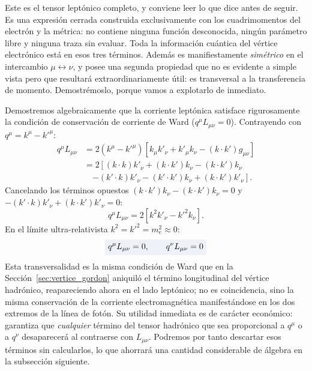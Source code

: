 \documentclass[10pt,a4paper]{article}
\newcommand{\dest}[1]{{\setlength{\fboxsep}{4pt}\colorbox{colordest}{$\displaystyle #1$}}}
\begin{document}
Este es el tensor leptónico completo, y conviene leer lo que dice antes de seguir. Es una expresión cerrada construida exclusivamente con los cuadrimomentos del electrón y la métrica: no contiene ninguna función desconocida, ningún parámetro libre y ninguna traza sin evaluar. Toda la información cuántica del vértice electrónico está en esos tres términos. Además es manifiestamente \emph{simétrico} en el intercambio $\mu \leftrightarrow \nu$, y posee una segunda propiedad que no es evidente a simple vista pero que resultará extraordinariamente útil: es transversal a la transferencia de momento. Demostrémoslo, porque vamos a explotarlo de inmediato.

Demostremos algebraicamente que la corriente leptónica satisface rigurosamente la condición de conservación de corriente de Ward ($q^\mu L_{\mu\nu} = 0$). Contrayendo con $q^\mu = k^\mu - k'^\mu$:
\begin{align}
q^\mu L_{\mu\nu} &= 2 (k^\mu - k'^\mu) \left[ k_\mu k'_\nu + k'_\mu k_\nu - (k \cdot k') g_{\mu\nu} \right] \nonumber \\
&= 2 \left[ (k \cdot k) k'_\nu + (k \cdot k') k_\nu - (k \cdot k') k_\nu \right. \nonumber \\
&\quad \left. - (k' \cdot k) k'_\nu - (k' \cdot k') k_\nu + (k \cdot k') k'_\nu \right].
\end{align}
Cancelando los términos opuestos $(k \cdot k') k_\nu - (k \cdot k') k_\nu = 0$ y $-(k' \cdot k) k'_\nu + (k \cdot k') k'_\nu = 0$:
\begin{equation}
q^\mu L_{\mu\nu} = 2 \left[ k^2 k'_\nu - k'^2 k_\nu \right].
\end{equation}
En el límite ultra-relativista $k^2 = k'^2 = m_e^2 \approx 0$:
\begin{equation}
\dest{q^\mu L_{\mu\nu} = 0, \qquad q^\nu L_{\mu\nu} = 0}
\end{equation}
Esta transversalidad es la misma condición de Ward que en la Sección~\ref{sec:vertice_gordon} aniquiló el término longitudinal del vértice hadrónico, reapareciendo ahora en el lado leptónico; no es coincidencia, sino la misma conservación de la corriente electromagnética manifestándose en los dos extremos de la línea de fotón. Su utilidad inmediata es de carácter económico: garantiza que \emph{cualquier} término del tensor hadrónico que sea proporcional a $q^\mu$ o a $q^\nu$ desaparecerá al contraerse con $L_{\mu\nu}$. Podremos por tanto descartar esos términos sin calcularlos, lo que ahorrará una cantidad considerable de álgebra en la subsección siguiente.
\end{document}
